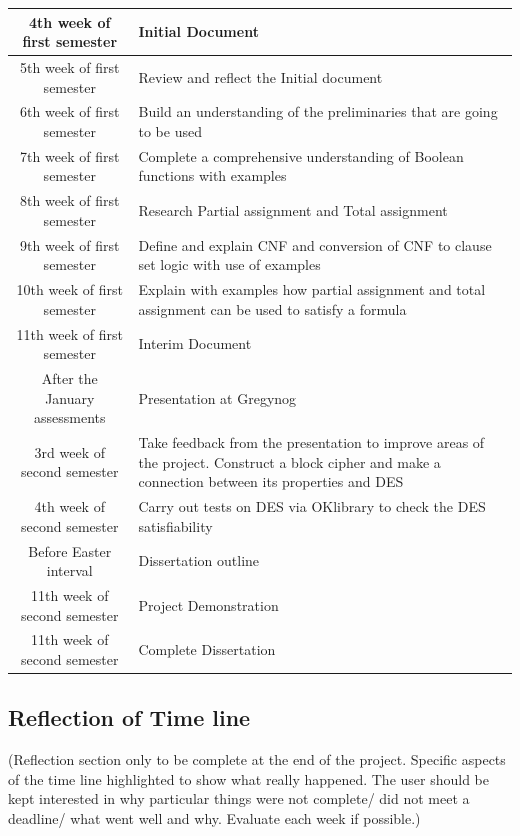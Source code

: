 \documentclass[11pt,a4paper, notitlepage]{report}
\begin{document}
\begin{center}
\begin{tabular}{|c|p{5cm}|}
\hline
4th week of first semester & Initial Document \\\hline
5th week of first semester & Review and reflect the Initial document\\ \hline
6th week of first semester & Build an understanding of the preliminaries that are going to be used\\ \hline
7th week of first semester & Complete a comprehensive understanding of Boolean functions with examples\\ \hline
8th week of first semester & Research Partial assignment and Total assignment \\ \hline
9th week of first semester & Define and explain CNF and conversion of CNF to clause set logic with use of examples \\ \hline
10th week of first semester & Explain with examples how partial assignment and total assignment can be used to satisfy a formula\\\hline
11th week of first semester & Interim Document\\ \hline
After the January assessments & Presentation at Gregynog\\ \hline
3rd week of second semester & Take feedback from the presentation to improve areas of the project. Construct a block cipher and make a connection between its properties and DES\\ \hline
4th week of second semester & Carry out tests on DES via OKlibrary to check the DES satisfiability\\ \hline
Before Easter interval & Dissertation outline\\ \hline
11th week of second semester & Project Demonstration\\ \hline
11th week of second semester & Complete Dissertation\\ \hline
\hline
\end{tabular}
\end{center}

\subsection{Reflection of Time line}
\label{subsec:Reflection}
(Reflection section only to be complete at the end of the project. Specific aspects of the time line highlighted to show what really happened. The user should be kept interested in why particular things were not complete/ did not meet a deadline/ what went well and why. Evaluate each week if possible.)
\end{document}
